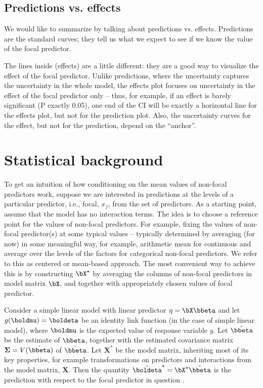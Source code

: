 \subsection*{Predictions vs. effects}

We would like to summarize by talking about predictions vs. effects. Predictions are the standard curves; they tell us what we expect to see if we know the value of the focal predictor.

The lines inside (effects) are a little different: they are a good way to visualize the effect of the focal predictor. Unlike predictions, where the uncertainty captures the uncertainty in the whole model, the effects plot focuses on uncertainty in the effect of the focal predictor only -- thus, for example, if an effect is barely significant (P exactly 0.05), one end of the CI will be exactly a horizontal line for the effects plot, but not for the prediction plot. Also, the uncertainty curves for the effect, but not for the prediction, depend on the ``anchor''.



\section*{Statistical background}

To get an intuition of how conditioning on the mean values of non-focal predictors work, suppose we are interested in predictions at the levels of a particular predictor, i.e., focal, $x_f$, from the set of predictors. As a starting point, assume that the model has no interaction terms. The idea is to choose a reference point for the values of non-focal predictors. For example, fixing the values of non-focal predictor(s) at some typical values -- typically determined by averaging (for now) in some meaningful way, for example, arithmetic mean  for continuous and average over the levels of the factors for categorical non-focal predictors. We refer to this as centered or mean-based approach. The most convenient way to achieve this is by constructing $\bX^\star$ by averaging the columns of non-focal predictors in model matrix $\bX$, and together with appropriately chosen values of focal predictor.


Consider a simple linear model with linear predictor $\eta = \bX\bbeta$ and let $g(\boldmu) = \boldeta$ be an identity link function (in the case of simple linear model), where $\boldmu$ is the expected value of response variable $y$. Let $\hat{\bbeta}$ be the estimate of $\bbeta$, together with the estimated covariance matrix $\boldsymbol{\Sigma} = V(\hat{\bbeta})$ of $\hat{\bbeta}$. Let $\mathbf{X^*}$ be the model matrix, inheriting most of its key properties, for example transformations on predictors and interactions from the model matrix, $\mathbf{X}$. Then the quantity $\hat{\boldeta}^\star = \bX^\star\hat{\bbeta}$ is the prediction with respect to the focal predictor in question \citep{fox2009effect}.

